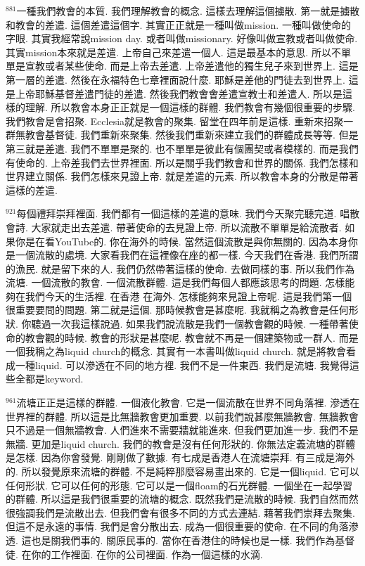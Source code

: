 \documentclass{book}
\begin{document}
$^{881}$一種我們教會的本質.
我們理解教會的概念.
這樣去理解這個擄散.
第一就是擄散和教會的差遣.
這個差遣這個字.
其實正正就是一種叫做mission.
一種叫做使命的字眼.
其實我經常說mission day.
或者叫做missionary.
好像叫做宣教或者叫做使命.
其實mission本來就是差遣.
上帝自己來差遣一個人.
這是最基本的意思.
所以不單單是宣教或者某些使命.
而是上帝去差遣.
上帝差遣他的獨生兒子來到世界上.
這是第一層的差遣.
然後在永福特色七章裡面說什麼.
耶穌是差他的門徒去到世界上.
這是上帝耶穌基督差遣門徒的差遣.
然後我們教會會差遣宣教士和差遣人.
所以是這樣的理解.
所以教會本身正正就是一個這樣的群體.
我們教會有幾個很重要的步驟.
我們教會是會招聚.
Ecclesia就是教會的聚集.
留堂在四年前是這樣.
重新來招聚一群無教會基督徒.
我們重新來聚集.
然後我們重新來建立我們的群體成長等等.
但是第三就是差遣.
我們不單單是聚的.
也不單單是彼此有個團契或者模樣的.
而是我們有使命的.
上帝差我們去世界裡面.
所以是關乎我們教會和世界的關係.
我們怎樣和世界建立關係.
我們怎樣來見證上帝.
就是差遣的元素.
所以教會本身的分散是帶著這樣的差遣.

$^{921}$每個禮拜崇拜裡面.
我們都有一個這樣的差遣的意味.
我們今天聚完聽完道.
唱散會詩.
大家就走出去差遣.
帶著使命的去見證上帝.
所以流散不單單是給流散者.
如果你是在看YouTube的.
你在海外的時候.
當然這個流散是與你無關的.
因為本身你是一個流散的處境.
大家看我們在這裡像在座的都一樣.
今天我們在香港.
我們所謂的漁民.
就是留下來的人.
我們仍然帶著這樣的使命.
去做同樣的事.
所以我們作為流塘.
一個流散的教會.
一個流散群體.
這是我們每個人都應該思考的問題.
怎樣能夠在我們今天的生活裡.
在香港 在海外.
怎樣能夠來見證上帝呢.
這是我們第一個很重要要問的問題.
第二就是這個.
那時候教會是甚麼呢.
我就稱之為教會是任何形狀.
你聽過一次我這樣說過.
如果我們說流散是我們一個教會觀的時候.
一種帶著使命的教會觀的時候.
教會的形狀是甚麼呢.
教會就不再是一個建築物或一群人.
而是一個我稱之為liquid church的概念.
其實有一本書叫做liquid church.
就是將教會看成一種liquid.
可以滲透在不同的地方裡.
我們不是一件東西.
我們是流塘.
我覺得這些全都是keyword.

$^{961}$流塘正正是這樣的群體.
一個液化教會.
它是一個流散在世界不同角落裡.
滲透在世界裡的群體.
所以這是比無牆教會更加重要.
以前我們說甚麼無牆教會.
無牆教會只不過是一個無牆教會.
人們進來不需要牆就能進來.
但我們更加進一步.
我們不是無牆.
更加是liquid church.
我們的教會是沒有任何形狀的.
你無法定義流塘的群體是怎樣.
因為你會發覺.
剛剛做了數據.
有七成是香港人在流塘崇拜.
有三成是海外的.
所以發覺原來流塘的群體.
不是純粹那麼容易畫出來的.
它是一個liquid.
它可以任何形狀.
它可以任何的形態.
它可以是一個floam的石光群體.
一個坐在一起學習的群體.
所以這是我們很重要的流塘的概念.
既然我們是流散的時候.
我們自然而然很強調我們是流散出去.
但我們會有很多不同的方式去連結.
藉著我們崇拜去聚集.
但這不是永遠的事情.
我們是會分散出去.
成為一個很重要的使命.
在不同的角落滲透.
這也是關我們事的.
關原民事的.
當你在香港住的時候也是一樣.
我們作為基督徒.
在你的工作裡面.
在你的公司裡面.
作為一個這樣的水滴.
\end{document}
